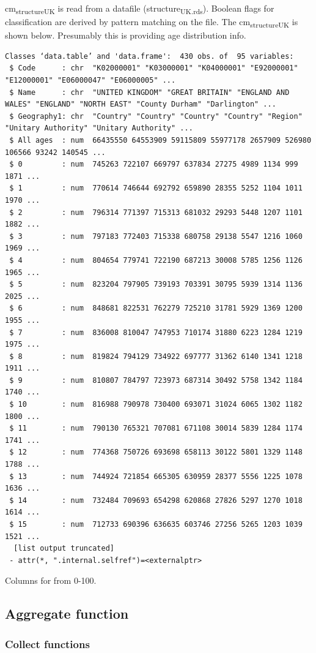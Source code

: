 \documentclass[11pt]{article}
\begin{document}
cm\textsubscript{structure}\textsubscript{UK} is read from a datafile (structure\textsubscript{UK.rds}).
Boolean flags for classification are derived by pattern matching on the file.
The cm\textsubscript{structure}\textsubscript{UK} is shown below. Presumably this is providing age distribution info.
\begin{verbatim}
Classes ‘data.table’ and 'data.frame':	430 obs. of  95 variables:
 $ Code      : chr  "K02000001" "K03000001" "K04000001" "E92000001" "E12000001" "E06000047" "E06000005" ...
 $ Name      : chr  "UNITED KINGDOM" "GREAT BRITAIN" "ENGLAND AND WALES" "ENGLAND" "NORTH EAST" "County Durham" "Darlington" ...
 $ Geography1: chr  "Country" "Country" "Country" "Country" "Region" "Unitary Authority" "Unitary Authority" ...
 $ All ages  : num  66435550 64553909 59115809 55977178 2657909 526980 106566 93242 140545 ...
 $ 0         : num  745263 722107 669797 637834 27275 4989 1134 999 1871 ...
 $ 1         : num  770614 746644 692792 659890 28355 5252 1104 1011 1970 ...
 $ 2         : num  796314 771397 715313 681032 29293 5448 1207 1101 1882 ...
 $ 3         : num  797183 772403 715338 680758 29138 5547 1216 1060 1969 ...
 $ 4         : num  804654 779741 722190 687213 30008 5785 1256 1126 1965 ...
 $ 5         : num  823204 797905 739193 703391 30795 5939 1314 1136 2025 ...
 $ 6         : num  848681 822531 762279 725210 31781 5929 1369 1200 1955 ...
 $ 7         : num  836008 810047 747953 710174 31880 6223 1284 1219 1975 ...
 $ 8         : num  819824 794129 734922 697777 31362 6140 1341 1218 1911 ...
 $ 9         : num  810807 784797 723973 687314 30492 5758 1342 1184 1740 ...
 $ 10        : num  816988 790978 730400 693071 31024 6065 1302 1182 1800 ...
 $ 11        : num  790130 765321 707081 671108 30014 5839 1284 1174 1741 ...
 $ 12        : num  774368 750726 693698 658113 30122 5801 1329 1148 1788 ...
 $ 13        : num  744924 721854 665305 630959 28377 5556 1225 1078 1636 ...
 $ 14        : num  732484 709693 654298 620868 27826 5297 1270 1018 1614 ...
 $ 15        : num  712733 690396 636635 603746 27256 5265 1203 1039 1521 ...
  [list output truncated]
 - attr(*, ".internal.selfref")=<externalptr>
\end{verbatim}

Columns for from 0-100.

\subsection{Aggregate function}
\label{sec:org61e6d37}
\subsubsection{Collect functions}
\label{sec:org4a84d18}
\end{document}

